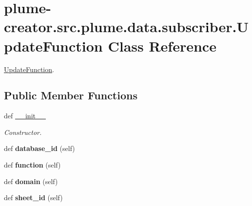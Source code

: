 \hypertarget{classplume-creator_1_1src_1_1plume_1_1data_1_1subscriber_1_1_update_function}{}\section{plume-\/creator.src.\+plume.\+data.\+subscriber.\+Update\+Function Class Reference}
\label{classplume-creator_1_1src_1_1plume_1_1data_1_1subscriber_1_1_update_function}


\hyperlink{classplume-creator_1_1src_1_1plume_1_1data_1_1subscriber_1_1_update_function}{Update\+Function}.  


\subsection*{Public Member Functions}
\begin{DoxyCompactItemize}
\item 
def \hyperlink{classplume-creator_1_1src_1_1plume_1_1data_1_1subscriber_1_1_update_function_a81c4200314e07911471dd98a43eecadb}{\+\_\+\+\_\+init\+\_\+\+\_\+}\hypertarget{classplume-creator_1_1src_1_1plume_1_1data_1_1subscriber_1_1_update_function_a81c4200314e07911471dd98a43eecadb}{}\label{classplume-creator_1_1src_1_1plume_1_1data_1_1subscriber_1_1_update_function_a81c4200314e07911471dd98a43eecadb}

\begin{DoxyCompactList}\small\item\em Constructor. \end{DoxyCompactList}\item 
def {\bfseries database\+\_\+id} (self)\hypertarget{classplume-creator_1_1src_1_1plume_1_1data_1_1subscriber_1_1_update_function_a85694e86daf9479e5ac1a07c399638ce}{}\label{classplume-creator_1_1src_1_1plume_1_1data_1_1subscriber_1_1_update_function_a85694e86daf9479e5ac1a07c399638ce}

\item 
def {\bfseries function} (self)\hypertarget{classplume-creator_1_1src_1_1plume_1_1data_1_1subscriber_1_1_update_function_a5667c8550d5e99554da22236c3043a76}{}\label{classplume-creator_1_1src_1_1plume_1_1data_1_1subscriber_1_1_update_function_a5667c8550d5e99554da22236c3043a76}

\item 
def {\bfseries domain} (self)\hypertarget{classplume-creator_1_1src_1_1plume_1_1data_1_1subscriber_1_1_update_function_aa3914fe302f53cb43e3b2b928a03bf7b}{}\label{classplume-creator_1_1src_1_1plume_1_1data_1_1subscriber_1_1_update_function_aa3914fe302f53cb43e3b2b928a03bf7b}

\item 
def {\bfseries sheet\+\_\+id} (self)\hypertarget{classplume-creator_1_1src_1_1plume_1_1data_1_1subscriber_1_1_update_function_aaf3b296f3c373d199c8d9845069c3a8a}{}\label{classplume-creator_1_1src_1_1plume_1_1data_1_1subscriber_1_1_update_function_aaf3b296f3c373d199c8d9845069c3a8a}

\end{DoxyCompactItemize}


